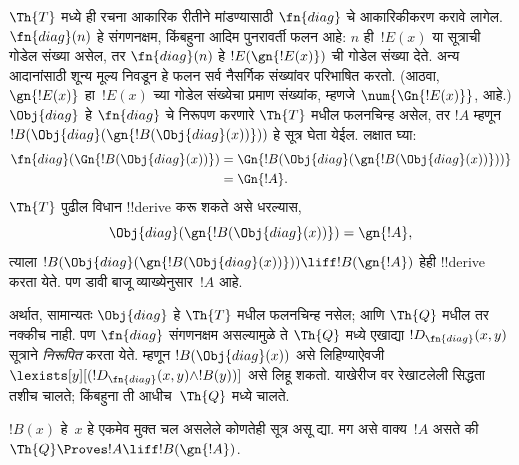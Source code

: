 \documentclass[../../../include/open-logic-section]{subfiles}
\begin{document}
\begin{explain}
$\Th{T}$ मध्ये ही रचना आकारिक रीतीने मांडण्यासाठी
$\fn{diag}$ चे आकारिकीकरण करावे लागेल.
$\fn{diag}(n)$ हे संगणनक्षम, किंबहुना आदिम पुनरावर्ती
फलन आहे: $n$ ही~$!E(x)$ या सूत्राची गोडेल
संख्या असेल, तर $\fn{diag}(n)$ हे
$!E(\gn{!E(x)})$ ची गोडेल संख्या देते. अन्य आदानांसाठी शून्य मूल्य निवडून
हे फलन सर्व नैसर्गिक संख्यांवर परिभाषित करतो.
(आठवा, $\gn{!E(x)}$ हा~$!E(x)$ च्या गोडेल
संख्येचा प्रमाण संख्यांक, म्हणजे
$\num{\Gn{!E(x)}}$, आहे.) $\Obj{diag}$ हे
$\fn{diag}$ चे निरूपण करणारे $\Th{T}$ मधील
फलनचिन्ह असेल, तर $!A$ म्हणून
$!B(\Obj{diag}(\gn{!B(\Obj{diag}(x))}))$
हे सूत्र घेता येईल. लक्षात घ्या:
\begin{align*}
\fn{diag}(\Gn{!B(\Obj{diag}(x))}) & =
\Gn{!B(\Obj{diag}(\gn{!B(\Obj{diag}(x))}))} \\
& = \Gn{!A}.
\end{align*}
$\Th{T}$ पुढील विधान !!{derive} करू शकते असे धरल्यास,
\[
\Obj{diag}(\gn{!B(\Obj{diag}(x))}) = \gn{!A},
\]
त्याला $!B(\Obj{diag}(\gn{!B(\Obj{diag}(x))}))
\liff !B(\gn{!A})$ हेही !!{derive} करता येते.
पण डावी बाजू व्याख्येनुसार~$!A$ आहे.

अर्थात, सामान्यतः $\Obj{diag}$ हे
$\Th{T}$ मधील फलनचिन्ह नसेल; आणि
$\Th{Q}$ मधील तर नक्कीच नाही. पण
$\fn{diag}$ संगणनक्षम असल्यामुळे ते
$\Th{Q}$ मध्ये एखाद्या
$!D_{\fn{diag}}(x,y)$ सूत्राने
\emph{निरूपित} करता येते. म्हणून
$!B(\Obj{diag}(x))$ असे लिहिण्याऐवजी
$\lexists[y][(!D_{\fn{diag}}(x,y) \land !B(y))]$
असे लिहू शकतो. याखेरीज वर रेखाटलेली सिद्धता तशीच
चालते; किंबहुना ती आधीच~$\Th{Q}$ मध्ये चालते.
\end{explain}

\begin{lem}
 $!B(x)$ हे~$x$ हे एकमेव मुक्त चल
असलेले कोणतेही सूत्र असू द्या. मग असे वाक्य~$!A$
असते की $\Th{Q} \Proves
!A \liff !B(\gn{!A})$.
\end{lem}
\end{document}
